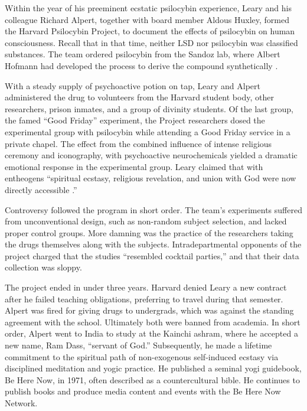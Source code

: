 \documentclass{UIdahoMastersThesis}
\begin{document}
Within the year of his preeminent ecstatic psilocybin experience, Leary and his colleague Richard Alpert, together with board member Aldous Huxley, formed the Harvard Psilocybin Project, to document the effects of psilocybin on human consciousness. Recall that in that time, neither LSD nor psilocybin was classified substances. The team ordered psilocybin from the Sandoz lab, where Albert Hofmann had developed the process to derive the compound synthetically \cite{melechi_psychedelia_1997}.

With a steady supply of psychoactive potion on tap, Leary and Alpert administered the drug to volunteers from the Harvard student body, other researchers, prison inmates, and a group of divinity students. Of the last group, the famed ``Good Friday'' experiment, the Project researchers dosed the experimental group with psilocybin while attending a Good Friday service in a private chapel. The effect from the combined influence of intense religious ceremony and iconography, with psychoactive neurochemicals yielded a dramatic emotional response in the experimental group. Leary claimed that with entheogens \enquote{spiritual ecstasy, religious revelation, and union with God were now directly accessible \cite{mansnerus_timothy_1996}.}

Controversy followed the program in short order. The team's experiments suffered from unconventional design, such as non-random subject selection, and lacked proper control groups. More damning was the practice of the researchers taking the drugs themselves along with the subjects. Intradepartmental opponents of the project charged that the studies ``resembled cocktail parties,'' and that their data collection was sloppy.

The project ended in under three years. Harvard denied Leary a new contract after he failed teaching obligations, preferring to travel during that semester. Alpert was fired for giving drugs to undergrads, which was against the standing agreement with the school. Ultimately both were banned from academia. In short order, Alpert went to India to study at the Kainchi ashram, where he accepted a new name, Ram Dass, ``servant of God.'' Subsequently, he made a lifetime commitment to the spiritual path of non-exogenous self-induced ecstasy via disciplined meditation and yogic practice. He published a seminal yogi guidebook, Be Here Now, in 1971, often described as a countercultural bible. He continues to publish books and produce media content and events with the Be Here Now Network.
\end{document}
